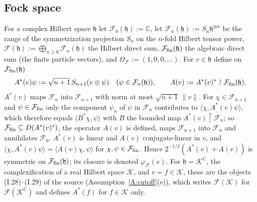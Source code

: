 \documentclass[11pt,a4paper]{article}
\theoremstyle{plain}
\theoremstyle{definition}
\theoremstyle{plain}
\theoremstyle{definition}
\newcommand{\C}{\mathbb{C}}
\newcommand{\ip}[2]{\langle #1,#2\rangle}
\begin{document}
\subsection*{Fock space}

For a complex Hilbert space $\mathfrak h$ let $\mathcal F_0(\mathfrak h):=\C$, let
$\mathcal F_n(\mathfrak h):=S_n\mathfrak h^{\otimes n}$ be the range of the symmetrization
projection $S_n$ on the $n$-fold Hilbert tensor power, $\mathcal F(\mathfrak h):=
\bigoplus_{n\ge0}\mathcal F_n(\mathfrak h)$ the Hilbert direct sum, $\mathcal F_{\rm fin}
(\mathfrak h)$ the algebraic direct sum (the finite particle vectors), and
$\Omega_{\mathcal F}:=(1,0,0,\dots)$.  For $v\in\mathfrak h$ define on $\mathcal F_{\rm fin}
(\mathfrak h)$
\[
 A^*(v)\psi:=\sqrt{n+1}\,S_{n+1}(v\otimes\psi)\quad(\psi\in\mathcal F_n(\mathfrak h)),\qquad
 A(v):=A^*(v)^*\upharpoonright\mathcal F_{\rm fin}(\mathfrak h) .
\]
$A^*(v)$ maps $\mathcal F_n$ into $\mathcal F_{n+1}$ with norm at most $\sqrt{n+1}\,\|v\|$.  For
$\chi\in\mathcal F_{n+1}$ and $\psi\in\mathcal F_{\rm fin}$ only the component $\psi_n$ of
$\psi$ in $\mathcal F_n$ contributes to $\ip\chi{A^*(v)\psi}$, which therefore equals
$\ip{B^*\chi}{\psi}$ with $B$ the bounded map $A^*(v)\upharpoonright\mathcal F_n$; so
$\mathcal F_{\rm fin}\subseteq D(A^*(v)^*)$, the operator $A(v)$ is defined, maps
$\mathcal F_{n+1}$ into $\mathcal F_n$ and annihilates $\mathcal F_0$.  $A^*(v)$ is linear and
$A(v)$ conjugate-linear in $v$, and $\ip\chi{A^*(v)\psi}=\ip{A(v)\chi}\psi$ for
$\chi,\psi\in\mathcal F_{\rm fin}$.  Hence $2^{-1/2}(A^*(v)+A(v))$ is symmetric on
$\mathcal F_{\rm fin}(\mathfrak h)$; its closure is denoted $\varphi_{\mathcal F}(v)$.  For
$\mathfrak h=\mathcal K^{\C}$, the complexification of a real Hilbert space $\mathcal K$, and
$v=f\in\mathcal K$, these are the objects (I.28)--(I.29) of the source
(Assumption~\ref{A:cutoff}(e)), which writes $\mathcal F(\mathcal K)$ for
$\mathcal F(\mathcal K^{\C})$ and defines $A^*(f)$ for $f\in\mathcal K$ only.
\end{document}
